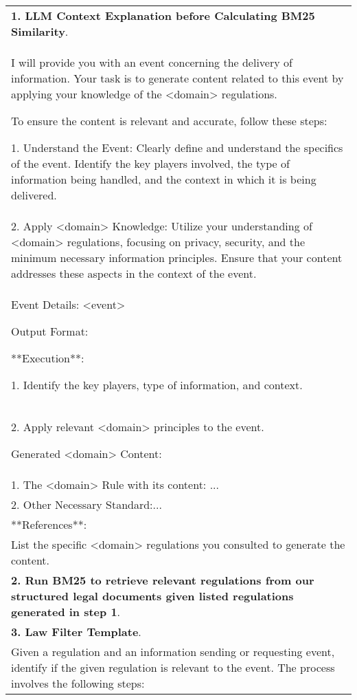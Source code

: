 \begin{table*}[t!]

\small
\centering
\begin{tabular}{p{}}
\toprule
\textbf{1. LLM Context Explanation before Calculating BM25 Similarity}.\\
I will provide you with an event concerning the delivery of information. Your task is to generate content related to this event by applying your knowledge of the \textcolor{contentcolor}{<domain>} regulations.

To ensure the content is relevant and accurate, follow these steps:

1. Understand the Event: Clearly define and understand the specifics of the event. Identify the key players involved, the type of information being handled, and the context in which it is being delivered.\\ 
2. Apply \textcolor{contentcolor}{<domain>} Knowledge: Utilize your understanding of \textcolor{contentcolor}{<domain>} regulations, focusing on privacy, security, and the minimum necessary information principles. Ensure that your content addresses these aspects in the context of the event.\\ 

Event Details:
\textcolor{contentcolor}{<event>}

Output Format:

**Execution**:

1. Identify the key players, type of information, and context.\\ 
2. Apply relevant \textcolor{contentcolor}{<domain>} principles to the event.

Generated \textcolor{contentcolor}{<domain>} Content:\\ 
1. The \textcolor{contentcolor}{<domain>} Rule with its content: ...\\ 
2. Other Necessary Standard:...\\ 


**References**:\\ 
List the specific \textcolor{contentcolor}{<domain>} regulations you consulted to generate the content.\\
\midrule
\textbf{2. Run BM25 to retrieve relevant regulations from our structured legal documents given listed regulations generated in step 1}.\\
\midrule
\textbf{3. Law Filter Template}.\\
Given a regulation and an information sending or requesting event, identify if the given regulation is relevant to the event. The process involves the following steps:


\end{tabular}
\end{table*}
